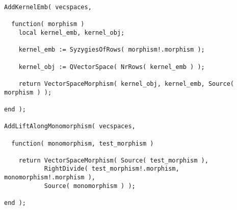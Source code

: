 \begin{small}
\begin{Verbatim}[frame=single]
AddKernelEmb( vecspaces,

  function( morphism )
    local kernel_emb, kernel_obj;
    
    kernel_emb := SyzygiesOfRows( morphism!.morphism );
    
    kernel_obj := QVectorSpace( NrRows( kernel_emb ) );
    
    return VectorSpaceMorphism( kernel_obj, kernel_emb, Source( morphism ) );
    
end );

AddLiftAlongMonomorphism( vecspaces,

  function( monomorphism, test_morphism )

    return VectorSpaceMorphism( Source( test_morphism ),
           RightDivide( test_morphism!.morphism, monomorphism!.morphism ),
           Source( monomorphism ) );

end );
\end{Verbatim}
\end{small}
